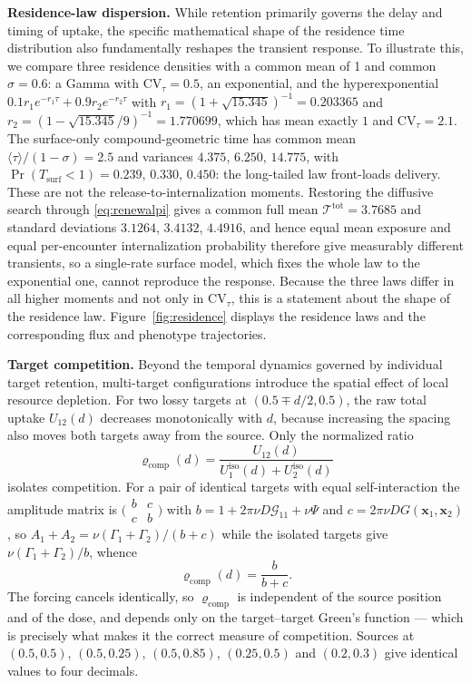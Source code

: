 \documentclass[pdflatex,sn-mathphys-num]{sn-jnl}
\numberwithin{equation}{section}
\theoremstyle{thmstyleone}%
\theoremstyle{definition}
\theoremstyle{remark}
\begin{document}
\medskip
\noindent\textbf{Residence-law dispersion.} While retention primarily governs the delay and timing of uptake, the specific mathematical shape of the residence time distribution also fundamentally reshapes the transient response. To illustrate this, we compare three residence densities with a common mean of 1 and common $\sigma=0.6$: a Gamma with $\mathrm{CV}_\tau=0.5$, an exponential, and the
hyperexponential $0.1r_1e^{-r_1\tau}+0.9r_2e^{-r_2\tau}$ with
$r_1=(1+\sqrt{15.345})^{-1}=0.203365$ and
$r_2=(1-\sqrt{15.345}/9)^{-1}=1.770699$, which has mean exactly $1$ and
$\mathrm{CV}_\tau=2.1$. The surface-only compound-geometric time has common mean
$\langle\tau\rangle/(1-\sigma)=2.5$ and variances $4.375$, $6.250$, $14.775$,
with $\Pr(T_{\mathrm{surf}}<1)=0.239$, $0.330$, $0.450$: the long-tailed law
front-loads delivery. These are not the release-to-internalization
moments. Restoring the diffusive search through \eqref{eq:renewalpi} gives a
common full mean $\mathcal T^{\mathrm{tot}}=3.7685$ and standard deviations
$3.1264$, $3.4132$, $4.4916$, and hence equal mean exposure and equal per-encounter internalization
probability therefore give measurably different transients, so a single-rate
surface model, which fixes the whole law to the exponential one, cannot
reproduce the response. Because the three laws differ in all higher moments and
not only in $\mathrm{CV}_\tau$, this is a statement about the shape of the
residence law. Figure~\ref{fig:residence} displays the residence laws and the corresponding flux and phenotype trajectories.

\medskip
\noindent\textbf{Target competition.} Beyond the temporal dynamics governed by individual target retention, multi-target configurations introduce the spatial effect of local resource depletion. For two lossy targets at $(0.5\mp d/2,0.5)$, the raw total uptake $U_{12}(d)$ decreases monotonically with $d$, because increasing the spacing also moves both targets away from the source. Only the normalized ratio
\begin{equation}
\varrho_{\mathrm{comp}}(d)=\frac{U_{12}(d)}
{U^{\mathrm{iso}}_1(d)+U^{\mathrm{iso}}_2(d)}
\label{eq:comp}
\end{equation}
isolates competition. For a pair of identical targets with equal
self-interaction the amplitude matrix is
$\bigl(\begin{smallmatrix}b&c\\c&b\end{smallmatrix}\bigr)$ with
$b=1+2\pi\nu D\mathcal G_{11}+\nu\Psi$ and
$c=2\pi\nu DG(\mathbf x_1,\mathbf x_2)$, so
$A_1+A_2=\nu(\Gamma_1+\Gamma_2)/(b+c)$ while the isolated targets give
$\nu(\Gamma_1+\Gamma_2)/b$, whence
\begin{equation}
\varrho_{\mathrm{comp}}(d)=\frac{b}{b+c}.
\label{eq:compclosed}
\end{equation}
The forcing cancels identically, so $\varrho_{\mathrm{comp}}$ is
independent of the source position and of the dose, and depends only on the
target--target Green's function --- which is precisely what makes it the correct measure of competition. Sources at $(0.5,0.5)$,
$(0.5,0.25)$, $(0.5,0.85)$, $(0.25,0.5)$ and $(0.2,0.3)$ give identical values
to four decimals.
\end{document}
